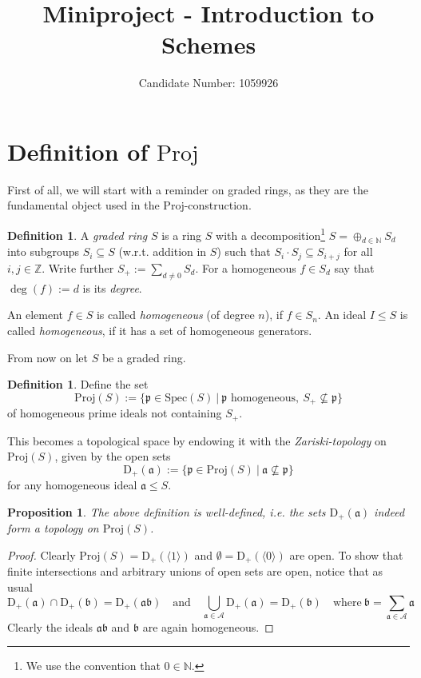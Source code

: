 \documentclass{scrartcl}
\title{Miniproject - Introduction to Schemes}
\author{Candidate Number: 1059926}
\newcommand{\N}{\mathbb{N}}
\newcommand{\Z}{\mathbb{Z}}
\newcommand{\D}[1]{\mathrm{D}_+(#1)}
\newcommand{\p}{\mathfrak{p}}
\renewcommand{\a}{\mathfrak{a}}
\renewcommand{\b}{\mathfrak{b}}
\newcommand{\Spec}{\mathrm{Spec}}
\newcommand{\Proj}{\mathrm{Proj}}
\newtheorem{prop}[subsection]{Proposition}
\theoremstyle{definition}
\newtheorem{definition}[subsection]{Definition}
\begin{document}
\maketitle

\tableofcontents

\section{Definition of $\Proj$}

First of all, we will start with a reminder on graded rings, as they are the fundamental object used in the $\Proj$-construction.
\begin{definition}
    A \emph{graded ring} $S$ is a ring $S$ with a decomposition\footnote{We use the convention that $0 \in \N$.} $S = \oplus_{d \in \N} S_d$ into subgroups $S_i \subseteq S$ (w.r.t. addition in $S$) such that $S_i \cdot S_j \subseteq S_{i + j}$ for all $i, j \in \Z$.
    Write further $S_+ := \sum_{d \neq 0} S_d$.
    For a homogeneous $f \in S_d$ say that $\deg(f) := d$ is its \emph{degree}.

    An element $f \in S$ is called \emph{homogeneous} (of degree $n$), if $f \in S_n$.
    An ideal $I \leq S$ is called \emph{homogeneous}, if it has a set of homogeneous generators.
\end{definition}
From now on let $S$ be a graded ring.
\begin{definition}
    Define the set
    \begin{equation*}
        \Proj(S) := \{ \p \in \Spec(S) \ | \ \text{$\p$ homogeneous}, \ S_+ \not\subseteq \p \}
    \end{equation*}
    of homogeneous prime ideals not containing $S_+$.

    This becomes a topological space by endowing it with the \emph{Zariski-topology} on $\Proj(S)$, given by the open sets
    \begin{equation*}
        \D{\a} := \{ \p \in \Proj(S) \ | \ \a \not\subseteq \p \}
    \end{equation*}
    for any homogeneous ideal $\a \leq S$.
\end{definition}
\begin{prop}
    The above definition is well-defined, i.e. the sets $\D{\a}$ indeed form a topology on $\Proj(S)$.
\end{prop}
\begin{proof}
    Clearly $\Proj(S) = \D{\langle 1 \rangle}$ and $\emptyset = \D{\langle 0 \rangle}$ are open.
    To show that finite intersections and arbitrary unions of open sets are open, notice that as usual
    \begin{equation*}
        \D{\a} \cap \D{\b} = \D{\a\b} \quad \text{and} \quad \bigcup_{\a \in \mathcal{A}} \D{\a} = \D{\b} \quad \text{where} \ \b = \sum_{\a \in \mathcal{A}} \a
    \end{equation*}
    Clearly the ideals $\a\b$ and $\b$ are again homogeneous.
\end{proof}
\end{document}

